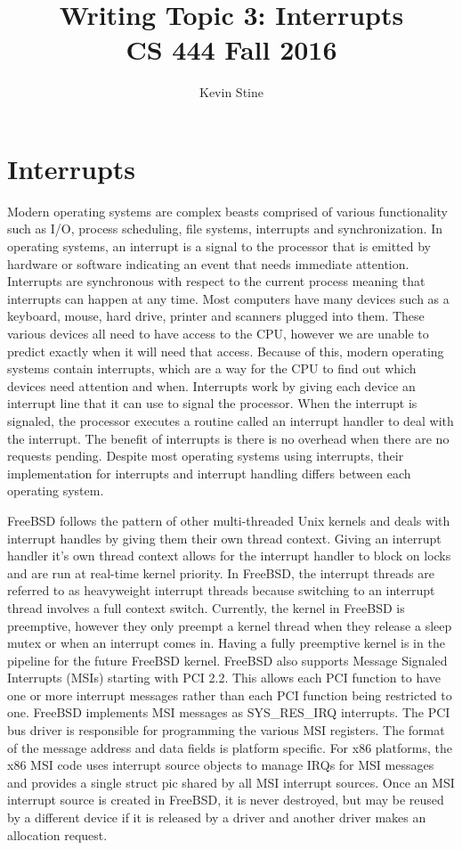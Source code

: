 \documentclass[letterpaper,10pt,draftclsnofoot,onecolumn,titlepage]{IEEEtran}
\def\name{Kevin Stine}
\begin{document}
	\title{\huge Writing Topic 3: Interrupts\\CS 444 Fall 2016}
	\author{\large \name}
	\maketitle
	\newpage
	\section*{Interrupts}
		Modern operating systems are complex beasts comprised of various functionality such as I/O, process scheduling, file systems, interrupts and synchronization.
	  In operating systems, an interrupt is a signal to the processor that is emitted by hardware or software indicating an event that needs immediate attention.
		Interrupts are synchronous with respect to the current process meaning that interrupts can happen at any time.
		Most computers have many devices such as a keyboard, mouse, hard drive, printer and scanners plugged into them.
		These various devices all need to have access to the CPU, however we are unable to predict exactly when it will need that access.
		Because of this, modern operating systems contain interrupts, which are a way for the CPU to find out which devices need attention and when.
		Interrupts work by giving each device an interrupt line that it can use to signal the processor.
		When the interrupt is signaled, the processor executes a routine called an interrupt handler to deal with the interrupt.
		The benefit of interrupts is there is no overhead when there are no requests pending.
		Despite most operating systems using interrupts, their implementation for interrupts and interrupt handling differs between each operating system.

		FreeBSD follows the pattern of other multi-threaded Unix kernels and deals with interrupt handles by giving them their own thread context.
		Giving an interrupt handler it's own thread context allows for the interrupt handler to block on locks and are run at real-time kernel priority.
		In FreeBSD, the interrupt threads are referred to as heavyweight interrupt threads because switching to an interrupt thread involves a full context switch.
		Currently, the kernel in FreeBSD is preemptive, however they only preempt a kernel thread when they release a sleep mutex or when an interrupt comes in.
		Having a fully preemptive kernel is in the pipeline for the future FreeBSD kernel.
		FreeBSD also supports Message Signaled Interrupts (MSIs) starting with PCI 2.2. This allows each PCI function to have one or more interrupt messages rather than each PCI function being restricted to one.
		FreeBSD implements MSI messages as SYS_RES_IRQ interrupts. The PCI bus driver is responsible for programming the various MSI registers.
		The format of the message address and data fields is platform specific.
		For x86 platforms, the x86 MSI code uses interrupt source objects to manage IRQs for MSI messages and provides a single struct pic shared by all MSI interrupt sources.
		Once an MSI interrupt source is created in FreeBSD, it is never destroyed, but may be reused by a different device if it is released by a driver and another driver makes an allocation request.
\end{document}

